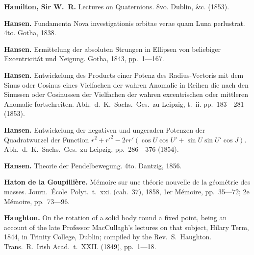 \documentclass[12pt,a4paper]{article}
\theoremstyle{definition}
\begin{document}
\vspace{0.5em}

\noindent\textbf{Hamilton, Sir W.~R.} Lectures on Quaternions. 8vo. Dublin, \&c. (1853).

\vspace{0.5em}

\noindent\textbf{Hansen.} Fundamenta Nova investigationis orbitae verae quam Luna perlustrat. 4to. Gotha, 1838.

\vspace{0.5em}

\noindent\textbf{Hansen.} Ermittelung der absoluten Strungen in Ellipsen von beliebiger Excentricit\'{a}t und Neigung. Gotha, 1843, pp.~1---167.

\vspace{0.5em}

\noindent\textbf{Hansen.} Entwickelung des Products einer Potenz des Radius-Vectoris mit dem Sinus oder Cosinus eines Vielfachen der wahren Anomalie in Reihen die nach den Sinussen oder Cosinussen der Vielfachen der wahren excentrischen oder mittleren Anomalie fortschreiten. Abh.~d.~K.~Sachs.~Ges.~zu Leipzig, t.~ii. pp.~183---281 (1853).

\vspace{0.5em}

\noindent\textbf{Hansen.} Entwickelung der negativen und ungeraden Potenzen der Quadratwurzel der Function $r^2 + r'^2 - 2rr'(\cos U \cos U' + \sin U \sin U' \cos J)$. Abh.~d.~K.~Sachs.~Ges.~zu Leipzig, pp.~286---376 (1854).

\vspace{0.5em}

\noindent\textbf{Hansen.} Theorie der Pendelbewegung. 4to. Dantzig, 1856.

\vspace{0.5em}

\noindent\textbf{Haton de la Goupilli\`{e}re.} M\'{e}moire sur une th\'{e}orie nouvelle de la g\'{e}om\'{e}trie des masses. Journ.~\'{E}cole~Polyt.~t.~xxi. (cah.~37), 1858, 1er M\'{e}moire, pp.~35---72; 2e M\'{e}moire, pp.~73---96.

\vspace{0.5em}

\noindent\textbf{Haughton.} On the rotation of a solid body round a fixed point, being an account of the late Professor MacCullagh's lectures on that subject, Hilary Term, 1844, in Trinity College, Dublin; compiled by the Rev.~S.~Haughton. Trans.~R.~Irish Acad.~t.~XXII. (1849), pp.~1---18.
\end{document}
